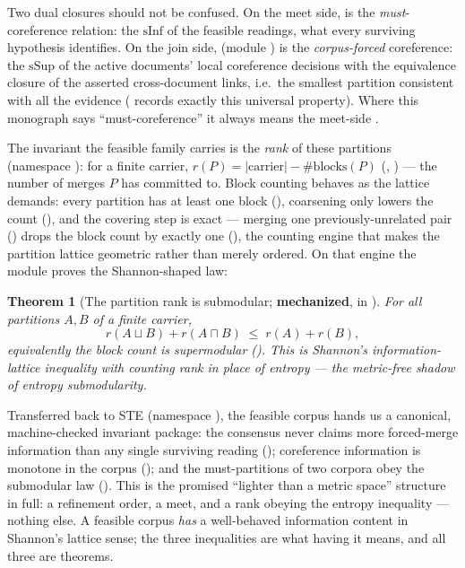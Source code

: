 \documentclass[11pt]{article}
\newtheorem{theorem}{Theorem}
\begin{document}
Two dual closures should not be confused.  On the meet side,
 is the \emph{must}-coreference relation: the
$\mathrm{sInf}$ of the feasible readings, what every surviving
hypothesis identifies.  On the join side, 
(module ) is the \emph{corpus-forced}
coreference: the $\mathrm{sSup}$ of the active documents' local
coreference decisions with the equivalence closure of the asserted
cross-document links, i.e.\ the smallest partition consistent with
all the evidence ( records exactly this
universal property).  Where this monograph says
``must-coreference'' it always means the meet-side
.

The invariant the feasible family carries is the \emph{rank} of
these partitions (namespace ): for a finite
carrier, $r(P) = \lvert\text{carrier}\rvert - \#\mathrm{blocks}(P)$
(, ) --- the number of merges $P$ has
committed to.  Block counting behaves as the lattice demands: every
partition has at least one block (),
coarsening only lowers the count (), and
the covering step is exact --- merging one previously-unrelated
pair () drops the block count by exactly one
(), the counting engine that makes the
partition lattice geometric rather than merely ordered.  On that
engine the module proves the Shannon-shaped law:

\begin{theorem}[The partition rank is submodular;
\textbf{mechanized},  in
]
\label{thm:ranksubmod}
For all partitions $A, B$ of a finite carrier,
\[
  r(A \sqcup B) + r(A \sqcap B) \;\le\; r(A) + r(B),
\]
equivalently the block count is supermodular
().  This is Shannon's
information-lattice inequality with counting rank in place of
entropy --- the metric-free shadow of entropy submodularity.
\end{theorem}

Transferred back to STE (namespace ),
the feasible corpus hands us a canonical, machine-checked invariant
package: the consensus never claims more forced-merge information
than any single surviving reading
(); coreference information is
monotone in the corpus (); and the
must-partitions of two corpora obey the submodular law
().  This is the promised
``lighter than a metric space'' structure in full: a refinement
order, a meet, and a rank obeying the entropy inequality ---
nothing else.  A feasible corpus \emph{has} a well-behaved
information content in Shannon's lattice sense; the three
inequalities are what having it means, and all three are theorems.
\end{document}
